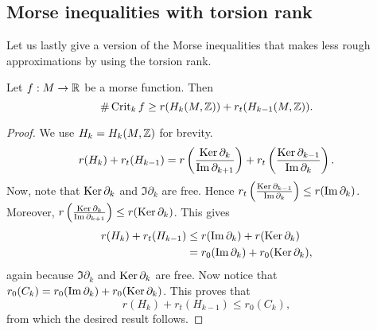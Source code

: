 \subsection{Morse inequalities with torsion rank}

Let us lastly give a version of the Morse inequalities that makes less rough approximations by using the torsion rank.
\begin{theorem}
    Let $f: M \to  \mathbb{R}$ be a morse function.
    Then
    \[
    \# \operatorname{Crit}_k f \ge r( H_k(M, \mathbb{Z})) + r_t(H_{k-1}(M, \mathbb{Z})).
\]
\end{theorem}
\begin{proof}
    We use $H_k = H_k(M, \mathbb{Z})$ for brevity.
    \begin{align*}
        r(H_k) + r_t(H_{k-1}) = r\left( \frac{\operatorname{Ker} \partial_k}{\operatorname{Im} \partial_{k+1}} \right) + r_t \left( \frac{\operatorname{Ker} \partial_{k-1}}{\operatorname{Im} \partial_k} \right) 
    .\end{align*}
    Now, note that $\operatorname{Ker} \partial_k$ and $\Im \partial_k$ are free. Hence $r_t\left(\frac{\operatorname{Ker} \partial_{k-1}}{\operatorname{Im} \partial_k}\right)\le  r (\operatorname{Im} \partial_k)$.
    Moreover, $r\left( \frac{\operatorname{Ker} \partial_k}{\operatorname{Im} \partial_{k+1}} \right) \le r(\operatorname{Ker} \partial_k)$.
    This gives
    \begin{align*}
        r(H_k) + r_t(H_{k-1})  &\le  r(\operatorname{Im} \partial_k) + r (\operatorname{Ker} \partial_k)\\
                               &= r_0(\operatorname{Im} \partial_k) + r_0 (\operatorname{Ker} \partial_k),
    \end{align*} 
    again because $\Im \partial_k $ and  $\operatorname{Ker} \partial_k$ are free.
    Now notice that $r_0(C_k) = r_0(\operatorname{Im} \partial_k) + r_0(\operatorname{Ker} \partial_k)$.
    This proves that
    \[
        r(H_k) + r_t(H_{k-1}) \le  r_0 (C_k)
    ,\] 
    from which the desired result follows.
\end{proof}


